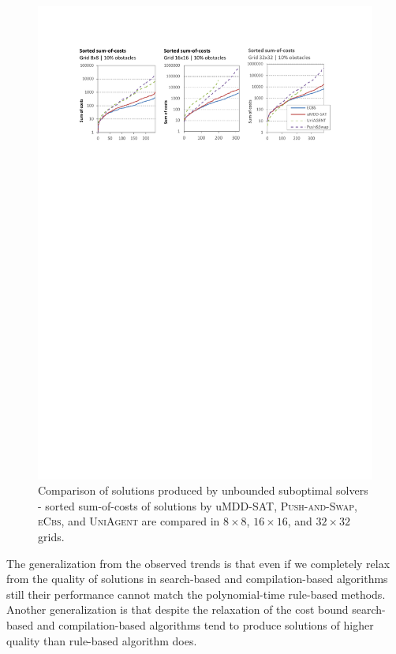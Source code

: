 \documentclass[jair,oneside,11pt]{article}
\begin{document}
\begin{figure}[h]
\centering
\includegraphics[trim={2.5cm 21.0cm 2.5cm 2.6cm},clip,width=\textwidth]{expr-sub_grids-soc-sorted.pdf}
\vspace{-0.8cm}
\caption{Comparison of solutions produced by unbounded suboptimal solvers  - sorted sum-of-costs of solutions by uMDD-SAT, \textsc{Push-and-Swap}, \textsc{eCbs}, and \textsc{UniAgent} are compared in $8{}\times{}8$, $16{}\times{}16$, and $32{}\times{}32$ grids.}
\label{expr-sub_grids-U-soc-sorted}
\end{figure}

The generalization from the observed trends is that even if we completely relax from the quality of solutions in search-based and compilation-based algorithms still their performance cannot match the polynomial-time rule-based methods. Another generalization is that despite the relaxation of the cost bound search-based and compilation-based algorithms tend to produce solutions of higher quality than rule-based algorithm does.
\end{document}
